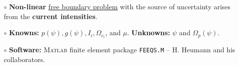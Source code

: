 \documentclass{beamer}
\begin{document}
\begin{frame}[t]
\begin{minipage}[t]{\linewidth}
\begin{columns}
\begin{column}{0.66\linewidth}
{\begin{itemize}[leftmargin=40pt]
            \item[$\circ$] {\bf Non-linear} \underline{free boundary problem} with the source of uncertainty arises from the \textcolor{myred}{\bf current intensities}.

            \item[$\circ$] {\bf Knowns:} $ p(\psi), g(\psi), I_i, \Omega_{c_i}$, and  $\mu$. {\bf Unknowns:} $\psi$ and $\Omega_p(\psi)$.
            
            \item[$\circ$] \textcolor{myblue3}{\bf Software:} \textsc{Matlab} finite element package {\tt FEEQS.M} -- H. Heumann and his collaborators.

            \end{itemize}
            }
        \end{column}
        

\end{columns}
\end{minipage}
\end{frame}
\end{document}
